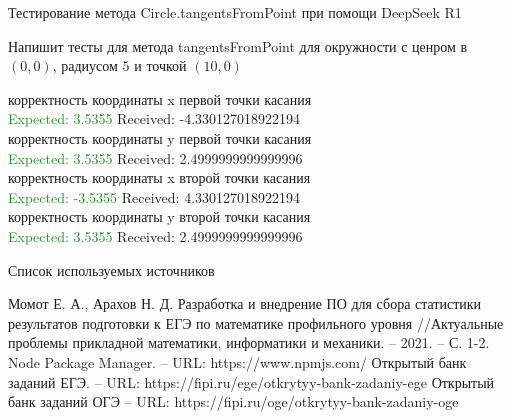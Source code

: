 \documentclass[aspectratio=169,12pt]{beamer}
\newcommand{\greencheck}{{\color{ForestGreen}\Checkmark}}
\newcommand{\redsolid}{{\color{BrickRed}\XSolid}}
\begin{document}
\begin{frame}[fragile]{Тестирование метода Circle.tangentsFromPoint при помощи DeepSeek R1}
	\begin{leftBox}
		Напишит тесты для метода tangentsFromPoint для окружности с ценром в $(0,0)$, радиусом $5$ и точкой $(10, 0)$
	\end{leftBox}
	
	\begin{rightBox}
		\redsolid корректность координаты x первой точки касания
		\\\textcolor{ForestGreen}{Expected: 3.5355} 
		\textcolor{BrickRed}{Received: -4.330127018922194} 
		\\\redsolid корректность координаты y первой точки касания
		\\\textcolor{ForestGreen}{Expected: 3.5355} 
		\textcolor{BrickRed}{Received: 2.4999999999999996} 
		\\\redsolid корректность координаты x второй точки касания
		\\\textcolor{ForestGreen}{Expected: -3.5355} 
		\textcolor{BrickRed}{Received: 4.330127018922194} 
		\\\redsolid корректность координаты y второй точки касания
		\\\textcolor{ForestGreen}{Expected: 3.5355} 
		\textcolor{BrickRed}{Received: 2.4999999999999996} 
	\end{rightBox}
\end{frame}

\begin{frame}{Список используемых источников}
	\begin{thebibliography}{10}
		 Момот Е. А., Арахов Н. Д. Разработка и внедрение ПО для сбора статистики результатов подготовки к ЕГЭ по математике профильного уровня //Актуальные проблемы прикладной математики, информатики и механики. – 2021. – С. 1-2.
		 Node Package Manager. – URL: https://www.npmjs.com/
		 Открытый банк заданий ЕГЭ. – URL: https://fipi.ru/ege/otkrytyy-bank-zadaniy-ege
		 Открытый банк заданий ОГЭ – URL:  https://fipi.ru/oge/otkrytyy-bank-zadaniy-oge
	\end{thebibliography}
\end{frame}
\end{document}
